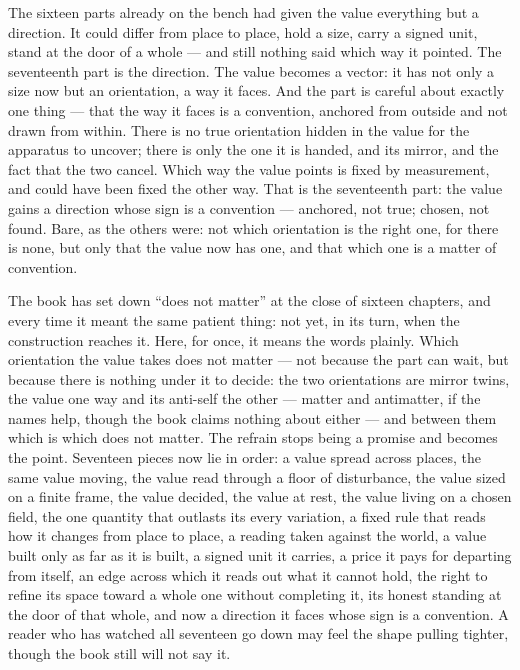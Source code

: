 The sixteen parts already on the bench had given the value everything but a direction. It could differ from place to place, hold a size, carry a signed unit, stand at the door of a whole --- and still nothing said which way it pointed. The seventeenth part is the direction. The value becomes a vector: it has not only a size now but an orientation, a way it faces. And the part is careful about exactly one thing --- that the way it faces is a convention, anchored from outside and not drawn from within. There is no true orientation hidden in the value for the apparatus to uncover; there is only the one it is handed, and its mirror, and the fact that the two cancel. Which way the value points is fixed by measurement, and could have been fixed the other way. That is the seventeenth part: the value gains a direction whose sign is a convention --- anchored, not true; chosen, not found. Bare, as the others were: not which orientation is the right one, for there is none, but only that the value now has one, and that which one is a matter of convention.

The book has set down ``does not matter'' at the close of sixteen chapters, and every time it meant the same patient thing: not yet, in its turn, when the construction reaches it. Here, for once, it means the words plainly. Which orientation the value takes does not matter --- not because the part can wait, but because there is nothing under it to decide: the two orientations are mirror twins, the value one way and its anti-self the other --- matter and antimatter, if the names help, though the book claims nothing about either --- and between them which is which does not matter. The refrain stops being a promise and becomes the point. Seventeen pieces now lie in order: a value spread across places, the same value moving, the value read through a floor of disturbance, the value sized on a finite frame, the value decided, the value at rest, the value living on a chosen field, the one quantity that outlasts its every variation, a fixed rule that reads how it changes from place to place, a reading taken against the world, a value built only as far as it is built, a signed unit it carries, a price it pays for departing from itself, an edge across which it reads out what it cannot hold, the right to refine its space toward a whole one without completing it, its honest standing at the door of that whole, and now a direction it faces whose sign is a convention. A reader who has watched all seventeen go down may feel the shape pulling tighter, though the book still will not say it.


